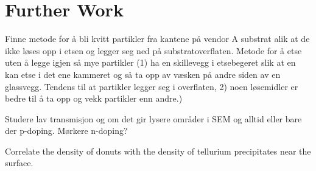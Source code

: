 \chapter{Further Work}\label{ch:further-work}


Finne metode for å bli kvitt partikler fra kantene på vendor A substrat alik at de ikke løses opp i etsen og legger seg ned på substratoverflaten. Metode for å etse uten å legge igjen så mye partikler (1) ha en skillevegg i etsebegeret slik at en kan etse i det ene kammeret og så ta opp av væsken på andre siden av en glassvegg. Tendens til at partikler legger seg i overflaten, 2) noen løsemidler er bedre til å ta opp og vekk partikler enn andre.)

Studere lav transmisjon og om det gir lysere områder i SEM og alltid eller bare der p-doping. Mørkere n-doping?

Correlate the density of donuts with the density of tellurium precipitates near the surface.

